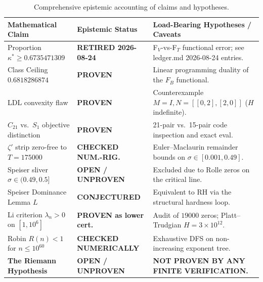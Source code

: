 \documentclass[11pt,a4paper]{article}
\theoremstyle{remark}
\begin{document}
\begin{table}[ht]
\centering
\small
\begin{tabular}{lll}
\toprule
Mathematical Claim & Epistemic Status & Load-Bearing Hypotheses / Caveats \\
\midrule
Proportion $\kappa^* \ge 0.6735471309$ & \textbf{RETIRED 2026-08-24} & F$_V$-vs-F$_T$ functional error; see ledger.md 2026-08-24 entries. \\
Class Ceiling $0.6818286874$ & \textbf{PROVEN} & Linear programming duality of the $F_B$ functional. \\
LDL convexity flaw & \textbf{PROVEN} & Counterexample $M=I, N=[[0,2],[2,0]]$ ($H$ indefinite). \\
$C_{21}$ vs.\ $S_1$ objective distinction & \textbf{PROVEN} & 21-pair vs.\ 15-pair code inspection and exact eval. \\
$\zeta'$ strip zero-free to $T=175000$ & \textbf{CHECKED NUM.-RIG.} & Euler--Maclaurin remainder bounds on $\sigma \in [0.001, 0.49]$. \\
Speiser sliver $\sigma \in (0.49, 0.5]$ & \textbf{OPEN / UNPROVEN} & Excluded due to Rolle zeros on the critical line. \\
Speiser Dominance Lemma $L$ & \textbf{CONJECTURED} & Equivalent to RH via the structural hardness loop. \\
Li criterion $\lambda_n > 0$ on $[1, 10^6]$ & \textbf{PROVEN as lower cert.} & Audit of $19000$ zeros; Platt--Trudgian $H=3\times 10^{12}$. \\
Robin $R(n) < 1$ for $n \le 10^{60}$ & \textbf{CHECKED NUMERICALLY} & Exhaustive DFS on non-increasing exponent tree. \\
\textbf{The Riemann Hypothesis} & \textbf{OPEN / UNPROVEN} & \textbf{NOT PROVEN BY ANY FINITE VERIFICATION.} \\
\bottomrule
\end{tabular}
\caption{Comprehensive epistemic accounting of claims and hypotheses.}
\label{tab:epistemic_ledger}
\end{table}
\end{document}
